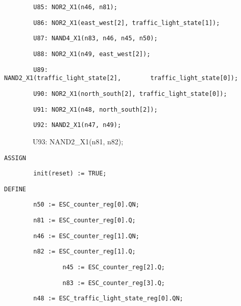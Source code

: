 \documentclass[a4paper]{article}
\begin{document}
\begin{center}
\begin{minipage}{6.04583in}
{\color[rgb]{0.0,0.0,0.039215688}
\texttt{\ \ \ \ \ \ \ \ U85: NOR2\_X1(n46, n81);}}

{\color[rgb]{0.0,0.0,0.039215688}
\texttt{\ \ \ \ \ \ \ \ U86: NOR2\_X1(east\_west[2],
traffic\_light\_state[1]);}}

{\color[rgb]{0.0,0.0,0.039215688}
\texttt{\ \ \ \ \ \ \ \ U87: NAND4\_X1(n83, n46, n45, n50);}}

{\color[rgb]{0.0,0.0,0.039215688}
\texttt{\ \ \ \ \ \ \ \ U88: NOR2\_X1(n49, east\_west[2]);}}

{\color[rgb]{0.0,0.0,0.039215688}
\texttt{\ \ \ \ \ \ \ \ U89:
NAND2\_X1(traffic\_light\_state[2],\ }\texttt{\ \ }\texttt{\ \ \ }\texttt{\ \ traffic\_light\_state[0]);}}

{\color[rgb]{0.0,0.0,0.039215688}
\texttt{\ \ \ \ \ \ \ \ U90: NOR2\_X1(north\_south[2],
traffic\_light\_state[0]);}}

{\color[rgb]{0.0,0.0,0.039215688}
\texttt{\ \ \ \ \ \ \ \ U91: NOR2\_X1(n48, north\_south[2]);}}

{\color[rgb]{0.0,0.0,0.039215688}
\texttt{\ \ \ \ \ \ \ \ U92: NAND2\_X1(n47, n49);}}

{\ttfamily\color[rgb]{0.0,0.0,0.039215688}
\ \ \ \ \ \ \ \ U93: NAND2\_X1(n81, n82);\ }

{\color[rgb]{0.0,0.0,0.039215688}
\texttt{ASSIGN}}

{\color[rgb]{0.0,0.0,0.039215688}
\texttt{\ \ \ \ \ \ \ \ init(reset) := TRUE;}}

{\color[rgb]{0.0,0.0,0.039215688}
\texttt{DEFINE}}

{\color[rgb]{0.0,0.0,0.039215688}
\texttt{\ \ \ \ \ \ \ \ n50 := ESC\_counter\_reg[0].QN;}}

{\color[rgb]{0.0,0.0,0.039215688}
\texttt{\ \ \ \ \ \ \ \ n81 := ESC\_counter\_reg[0].Q;}}

{\color[rgb]{0.0,0.0,0.039215688}
\texttt{\ \ \ \ \ \ \ \ n46 := ESC\_counter\_reg[1].QN;}}

{\color[rgb]{0.0,0.0,0.039215688}
\texttt{\ \ \ \ \ \ \ \ n82 := ESC\_counter\_reg[1].Q;}}

{\color[rgb]{0.0,0.0,0.039215688}
\texttt{\ \ \ \ \ \ \ \ \ \ \ \ \ \ \ \ n45 := ESC\_counter\_reg[2].Q;}}

{\color[rgb]{0.0,0.0,0.039215688}
\texttt{\ \ \ \ \ \ \ \ \ \ \ \ \ \ \ \ n83 := ESC\_counter\_reg[3].Q;}}

{\color[rgb]{0.0,0.0,0.039215688}
\texttt{\ \ \ \ \ \ \ \ n48 := ESC\_traffic\_light\_state\_reg[0].QN;}}


\end{minipage}
\end{center}
\end{document}
